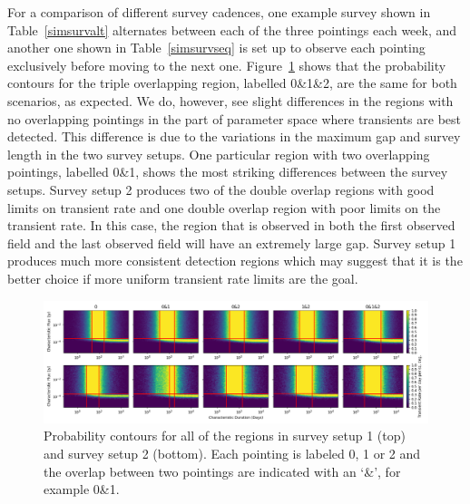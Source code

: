 \documentclass[12pt]{article}
\begin{document}
For a comparison of different survey cadences, one example survey shown in Table~\ref{simsurvalt} alternates between each of the three pointings each week, and another one shown in Table~\ref{simsurvseq} is set up to observe each pointing exclusively before moving to the next one. Figure~\ref{multirgnprob} shows that the probability contours for the triple overlapping region, labelled 0\&1\&2, are the same for both scenarios, as expected. We do, however, see slight differences in the regions with no overlapping pointings in the part of parameter space where transients are best detected. This difference is due to the variations in the maximum gap and survey length in the two survey setups. One particular region with two overlapping pointings, labelled 0\&1, shows the most striking differences between the survey setups. Survey setup 2 produces two of the double overlap regions with good limits on transient rate and one double overlap region with poor limits on the transient rate. In this case, the region that is observed in both the first observed field and the last observed field will have an extremely large gap. Survey setup 1 produces much more consistent detection regions which may suggest that it is the better choice if more uniform transient rate limits are the goal. 


 \begin{figure}
\includegraphics[width=\columnwidth]{multirgnprob.png}
\caption{Probability contours for all of the regions in survey setup 1 (top) and survey setup 2 (bottom). Each pointing is labeled 0, 1 or 2 and the overlap between two pointings are indicated with an `\&', for example 0\&1.}
\label{multirgnprob}
 \end{figure}
\end{document}
